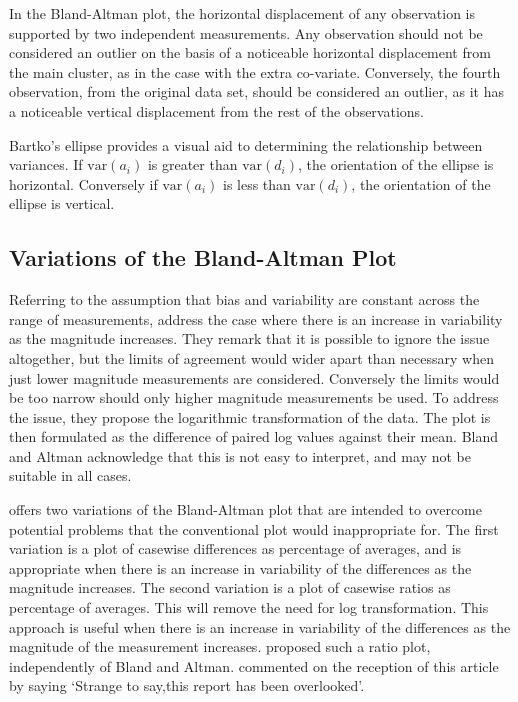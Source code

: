 \documentclass[12pt, a4paper]{report}
\begin{document}
	In the Bland-Altman plot, the horizontal displacement of any observation is supported by two independent measurements. Any
	observation should not be considered an outlier on the basis of a
	noticeable horizontal displacement from the main cluster, as in
	the case with the extra co-variate. Conversely, the fourth observation, from the original data set, should be considered an
	outlier, as it has a noticeable vertical displacement from the rest of the observations.
	
	Bartko's ellipse provides a visual aid to determining the relationship between variances. If $\mbox{var}(a_{i})$ is greater
	than $\mbox{var}(d_{i})$, the orientation of the ellipse is	horizontal. Conversely if $\mbox{var}(a_{i})$ is less than
	$\mbox{var}(d_{i})$, the orientation of the ellipse is vertical.
	\newpage
	
	
	
	
	\subsection{Variations of the Bland-Altman Plot} Referring to the
	assumption that bias and variability are constant across the range
	of measurements, \citet{BA99} address the case where there is an
	increase in variability as the magnitude increases. They remark
	that it is possible to ignore the issue altogether, but the limits
	of agreement would wider apart than necessary when just lower
	magnitude measurements are considered. Conversely the limits would
	be too narrow should only higher magnitude measurements be used.
	To address the issue, they propose the logarithmic transformation
	of the data. The plot is then formulated as the difference of
	paired log values against their mean. Bland and Altman acknowledge
	that this is not easy to interpret, and may not be suitable in
	all cases.
	
	\citet{BA99} offers two variations of the Bland-Altman plot that
	are intended to overcome potential problems that the conventional
	plot would inappropriate for. The first variation is a plot of
	casewise differences as percentage of averages, and is appropriate
	when there is an increase in variability of the differences as the
	magnitude increases. The second variation is a plot of casewise
	ratios as percentage of averages. This will remove the need for
	log transformation. This approach is useful when there is an
	increase in variability of the differences as the magnitude of the
	measurement increases. \citet{Eksborg} proposed such a ratio plot,
	independently of Bland and Altman. \citet{Dewitte} commented on
	the reception of this article by saying `Strange to say,this
	report has been overlooked'.
	
\end{document}

